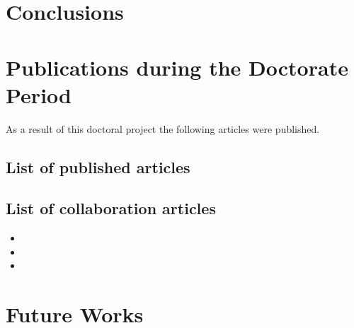 \section{Conclusions}

\section{Publications during the Doctorate Period}

As a result of this doctoral project the following articles were published.
\subsection{List of published articles}

\subsection{List of collaboration articles}
\begin{itemize}
	\item {} 
	\item {} 
    \item {}     
\end{itemize}

\section{Future Works}
%
